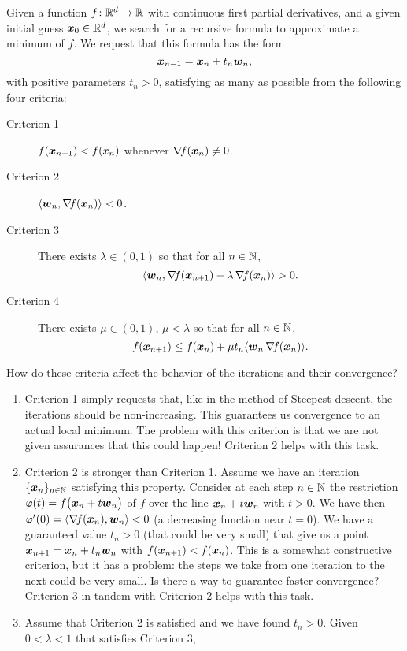 Given a function $f \colon \mathbb{R}^d \to \mathbb{R}$ with continuous first partial derivatives, and a given initial guess $\boldsymbol{x}_0 \in \mathbb{R}^d$, we search for a recursive formula to approximate a minimum of $f$.  We request that this formula has the form
\begin{equation*}
\boldsymbol{x}_{n-1} = \boldsymbol{x}_n + t_n \boldsymbol{w}_n,
\end{equation*}
with positive parameters $t_n > 0$, satisfying as many as possible from the following four criteria:
\begin{description}
	\item[Criterion 1] $f(\boldsymbol{x}_{n+1}) < f(x_n)$ whenever $\mathop{\nabla\! {f}}(\boldsymbol{x}_n) \neq 0$. 
	\item[Criterion 2] $\langle \boldsymbol{w}_n , \mathop{\nabla\! {f}}(\boldsymbol{x}_n) \rangle < 0$. 
	\item[Criterion 3] There exists $\lambda \in (0,1)$ so that for all $n\in \mathbb{N}$,
	\begin{equation*}
	\langle \boldsymbol{w}_n , \mathop{\nabla\! {f}}(\boldsymbol{x}_{n+1}) - \lambda \mathop{\nabla\! {f}} (\boldsymbol{x}_n) \rangle > 0.
	\end{equation*}
	\item[Criterion 4] There exists $\mu \in (0,1)$, $\mu < \lambda$ so that for all $n \in \mathbb{N}$,
	\begin{equation*}
	f(\boldsymbol{x}_{n+1}) \leq f(\boldsymbol{x}_n) + \mu t_n \langle \boldsymbol{w}_n \mathop{\nabla\! {f}}(\boldsymbol{x}_n) \rangle.
	\end{equation*}
\end{description}

\begin{remark} 
How do these criteria affect the behavior of the iterations and their convergence?
\begin{enumerate}
	\item Criterion 1 simply requests that, like in the method of Steepest descent, the iterations should be non-increasing.  This guarantees us convergence to an actual local minimum.  The problem with this criterion is that we are not given assurances that this could happen!  Criterion 2 helps with this task.
	\item Criterion 2 is stronger than Criterion 1.  Assume we have an iteration $\{ \boldsymbol{x}_n \}_{n \in \mathbb{N}}$ satisfying this property.  Consider at each step $n \in \mathbb{N}$ the restriction $\varphi(t)=f\big( \boldsymbol{x}_n + t \boldsymbol{w}_n \big)$ of $f$ over the line $\boldsymbol{x}_n + t \boldsymbol{w}_n$ with $t>0$.  We have then $\varphi'(0) = \langle \mathop{\nabla\! {f}}(\boldsymbol{x}_n), \boldsymbol{w}_n \rangle < 0$ (a decreasing function near $t=0$).  We have a guaranteed value $t_n > 0$ (that could be very small) that give us a point $\boldsymbol{x}_{n+1} = \boldsymbol{x}_n + t_n \boldsymbol{w}_n$ with $f(\boldsymbol{x}_{n+1}) < f(\boldsymbol{x}_n)$.  This is a somewhat constructive criterion, but it has a problem: the steps we take from one iteration to the next could be very small.  Is there a way to guarantee faster convergence?  Criterion 3 in tandem with Criterion 2 helps with this task.
	\item Assume that Criterion 2 is satisfied and we have found $t_n > 0$.  Given $0 < \lambda <1 $ that satisfies Criterion 3, 
\end{enumerate}
\end{remark}

